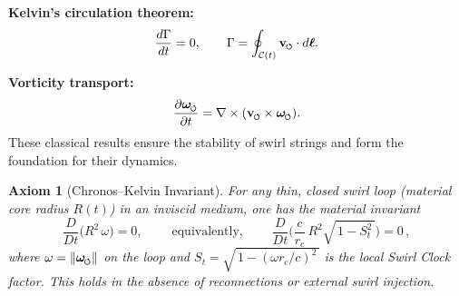 \documentclass[11pt]{article}
\newcommand{\swirlarrow}{%
    \mathchoice{\mkern-2mu\scriptstyle\boldsymbol{\circlearrowleft}}%
    {\mkern-2mu\scriptstyle\boldsymbol{\circlearrowleft}}%
    {\mkern-2mu\scriptscriptstyle\boldsymbol{\circlearrowleft}}%
    {\mkern-2mu\scriptscriptstyle\boldsymbol{\circlearrowleft}}%
}
\newcommand{\vswirl}{\mathbf{v}_{\swirlarrow}}
\newcommand{\omegas}{\boldsymbol{\omega}_{\swirlarrow}}  %
\newtheorem{axiom}{Axiom}
\begin{document}
    \textbf{Kelvin's circulation theorem:}
    \begin{equation}
    \frac{d\Gamma}{dt}=0, \qquad \Gamma=\oint_{\mathcal{C}(t)} \vswirl\cdot d\boldsymbol{\ell}. \label{eq:kelvin}
    \end{equation}

    \textbf{Vorticity transport:}
    \begin{equation}
    \pdv{\omegas}{t} = \nabla\times(\vswirl\times \omegas). \label{eq:vorticity-transport}
    \end{equation}
    These classical results ensure the stability of swirl strings and form the foundation for their dynamics.

    \begin{axiom}[Chronos–Kelvin Invariant]
    \label{ax:chronos-kelvin}
    For any thin, closed swirl loop (material core radius $R(t)$) in an inviscid medium, one has the material invariant
    \begin{equation}
    \boxed{\;
    \frac{D}{Dt}\!\Big(R^2\,\omega\Big)=0,
        \;} \qquad \text{equivalently,} \qquad
    \boxed{\;
    \frac{D}{Dt}\!\Big(
    \frac{c}{r_c}\,R^2 \sqrt{\,1-S_t^2\,}
    \Big)=0\,,
        \;}
    \label{eq:CK}
    \end{equation}
    where $\omega=\|\omegas\|$ on the loop and $S_t=\sqrt{\,1-(\omega r_c/c)^2\,}$ is the local Swirl Clock factor. This holds in the absence of reconnections or external swirl injection.
    \end{axiom}
\end{document}
